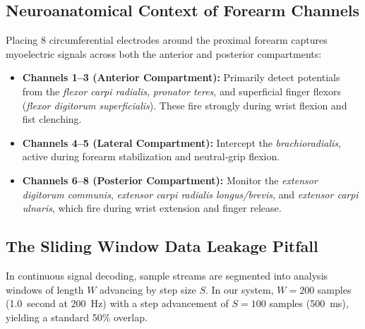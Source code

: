 \documentclass[11pt,a4paper]{article}
\begin{document}
\subsection{Neuroanatomical Context of Forearm Channels}
Placing 8 circumferential electrodes around the proximal forearm captures myoelectric signals across both the anterior and posterior compartments:
\begin{itemize}
    \item \textbf{Channels 1--3 (Anterior Compartment):} Primarily detect potentials from the \textit{flexor carpi radialis}, \textit{pronator teres}, and superficial finger flexors (\textit{flexor digitorum superficialis}). These fire strongly during wrist flexion and fist clenching.
    \item \textbf{Channels 4--5 (Lateral Compartment):} Intercept the \textit{brachioradialis}, active during forearm stabilization and neutral-grip flexion.
    \item \textbf{Channels 6--8 (Posterior Compartment):} Monitor the \textit{extensor digitorum communis}, \textit{extensor carpi radialis longus/brevis}, and \textit{extensor carpi ulnaris}, which fire during wrist extension and finger release.
\end{itemize}

\subsection{The Sliding Window Data Leakage Pitfall}
In continuous signal decoding, sample streams are segmented into analysis windows of length $W$ advancing by step size $S$. In our system, $W = 200$ samples (1.0~second at 200~Hz) with a step advancement of $S = 100$ samples (500~ms), yielding a standard 50\% overlap.
\end{document}
